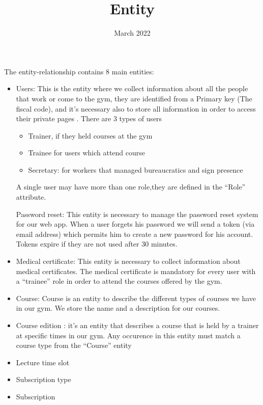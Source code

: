 \documentclass[12pt, letterpaper]{article}
\title{Entity}
\date{March 2022}
\begin{document}
The entity-relationship contains 8 main entities:
\begin{itemize}

\item Users: This is the entity where we collect information about all the people that work or come to the gym, they are identified from a Primary key (The fiscal code), and it’s necessary also to store all information in order to access their private pages . There are 3 types of users 
\begin{itemize}
	\item Trainer, if they held courses at the gym 
	\item Trainee for users which attend course
	\item Secretary: for workers that managed bureaucratics and sign presence
\end{itemize}
A single user may have more than one role,they are defined in the “Role” attribute. 

Password reset: This entity is necessary to manage the password reset system for our web app. When a user forgets his password we will send a token (via email address) which permits him to create a new password for his account. Tokens expire if they are not used after 30 minutes.
\item  Medical certificate: This entity is necessary to collect information about medical certificates. The medical certificate is mandatory for every user with a “trainee” role in order to attend the courses offered by the gym.
\item Course: Course is an entity to describe the different types of courses we have in our gym. We store the name and a description for our courses.
\item Course edition : it’s an entity that describes a course that is held by a trainer at specific times in our gym. Any occurence in this entity must match a course type from the “Course” entity
\item Lecture time slot
\item Subscription type
\item Subscription
\end{itemize}
\end{document}
